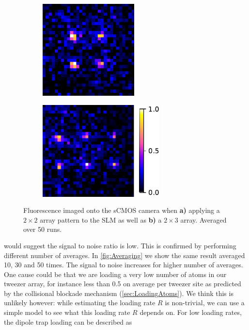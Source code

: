 \begin{figure}
    \centering
	\begin{subfigure}{.49\linewidth}
		\centering
		\includegraphics[height=5cm]{figures/2x2fluorescence.pdf}
		\caption{}
		\label{fig:fluor2x2}
	\end{subfigure}
	\hfill
	\begin{subfigure}{.49\linewidth}
		\centering
		\includegraphics[height=5cm]{figures/2x3fluorescence.pdf}
		\caption{}
		\label{fig:fluor2x3}
	\end{subfigure}
	\caption{
	Fluorescence imaged onto the sCMOS camera when \textsf{\textbf{a)}} applying a $2\times2$ array pattern to the SLM as well as \textsf{\textbf{b)}} a $2\times 3$ array.
	Averaged over 50 runs.
    }
    \label{fig:fluorescence}
\end{figure}
 would suggest the signal to noise ratio is low. 
This is confirmed by performing different number of averages.
In \cref{fig:Averaging} we show the same result averaged 10, 30 and 50 times. 
The signal to noise increases for higher number of averages.
One cause could be that we are loading a very low number of atoms in our tweezer array, for instance less than 0.5 on average per tweezer site as predicted by the collisional blockade mechanism (\cref{sec:LoadingAtoms}).
We think this is unlikely however: while estimating the loading rate $R$ is non-trivial, we can use a simple model to see what this loading rate $R$ depends on. 
For low loading rates, the dipole trap loading can be described as \cite{Kuppens2000}

